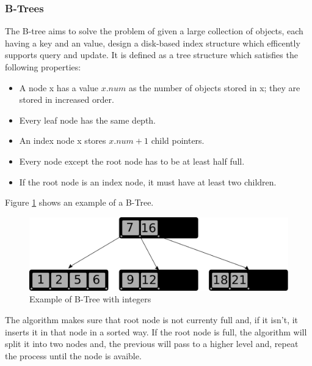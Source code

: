 \documentclass{sig-alternate-05-2015}
\begin{document}
    \subsubsection{B-Trees}
      The B-tree aims to solve the problem of given a large collection of objects, each having a key and an
      value, design a disk-based index structure which efficently supports query and update. It is defined as a tree
      structure which satisfies the following properties:
      \begin{itemize}
        \item A node x has a value $x.num$ as the number of objects stored in x; they are stored in increased order.
        \item Every leaf node has the same depth.
        \item An index node x stores $x.num+1$ child pointers.
        \item Every node except the root node has to be at least half full.
        \item If the root node is an index node, it must have at least two children.
      \end{itemize}
      Figure \ref{img:BTree} shows an example of a B-Tree.
      \begin{figure}
        \centering
        \includegraphics[scale=0.45]{BTree.pdf}
        \caption{Example of B-Tree with integers}
        \label{img:BTree}
      \end{figure}
      The algorithm makes sure that root node is not currenty full and, if it isn't, it inserts it in that node in a sorted
      way. If the root node is full, the algorithm will split it into two nodes and, the previous will pass to a higher level and,
      repeat the process until the node is avaible.
\end{document}
